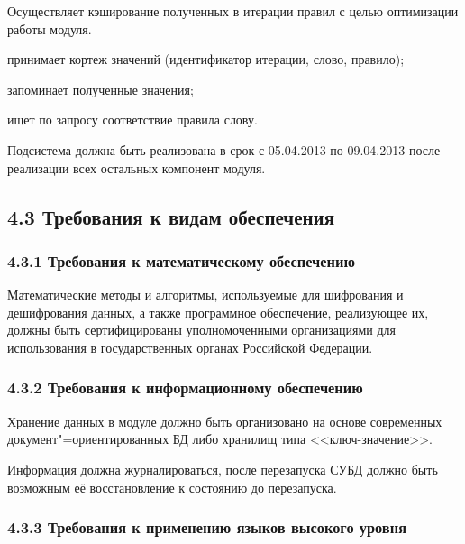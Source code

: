 Осуществляет кэширование полученных в итерации правил с целью оптимизации работы модуля.

\begin{list}{}{\leftmargin=1.5cm}
  \item принимает кортеж значений (идентификатор итерации, слово, правило);
  \item запоминает полученные значения;
  \item ищет по запросу соответствие правила слову.
\end{list}

Подсистема должна быть реализована в срок с 05.04.2013 по 09.04.2013 после реализации всех остальных компонент модуля.

\subsection*{4.3 Требования к видам обеспечения}

\subsubsection*{4.3.1 Требования к математическому обеспечению}

Математические методы и алгоритмы, используемые для шифрования и дешифрования
данных, а также программное обеспечение, реализующее их, должны быть
сертифицированы уполномоченными организациями для использования в
государственных органах Российской Федерации.

\subsubsection*{4.3.2 Требования к информационному обеспечению}

Хранение данных в модуле должно быть организовано на основе современных
документ"=ориентированных БД либо хранилищ типа <<ключ-значение>>.

Информация должна журналироваться, после перезапуска СУБД должно быть возможным её восстановление к состоянию до перезапуска. 

\subsubsection*{4.3.3 Требования к применению языков высокого уровня}

